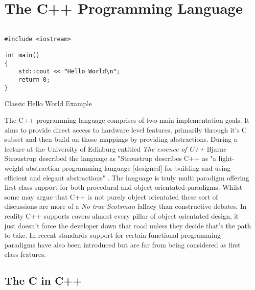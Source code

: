 \documentclass[conference, a4paper]{IEEEtran}
\begin{document}
\section{The C++ Programming Language}

\begin{listing}[h]

\begin{verbatim}

#include <iostream>

int main()
{
    std::cout << "Hello World\n";
    return 0;
}

\end{verbatim}

\caption{Classic Hello World Example} \label{listing:1}
\end{listing}
The C++ programming language comprises of two main implementation goals. It aims to provide direct access to hardware level features, primarily through it's C subset and then build on those mappings by providing abstractions. During a lecture at the University of Edinburg entitled \textit{The essence of C++} Bjarne Stroustrup described the language as "Stroustrup describes C++ as "a light-weight abstraction programming language [designed] for building and using efficient and elegant abstractions" \cite{EssenceofC++}. The language is truly multi paradigm offering first class support for both procedural and object orientated paradigms. Whilst some may argue that C++ is not purely object orientated these sort of discussions are more of a \textit{No true Scotsman} fallacy than constructive debates. In reality C++ supports covers almost every pillar of object orientated design, it just doesn't force the developer down that road unless they decide that's the path to take. In recent standards support for certain functional programming paradigms have also been introduced but are far from being considered as first class features.

\subsection{ The C in C++}
\end{document}

